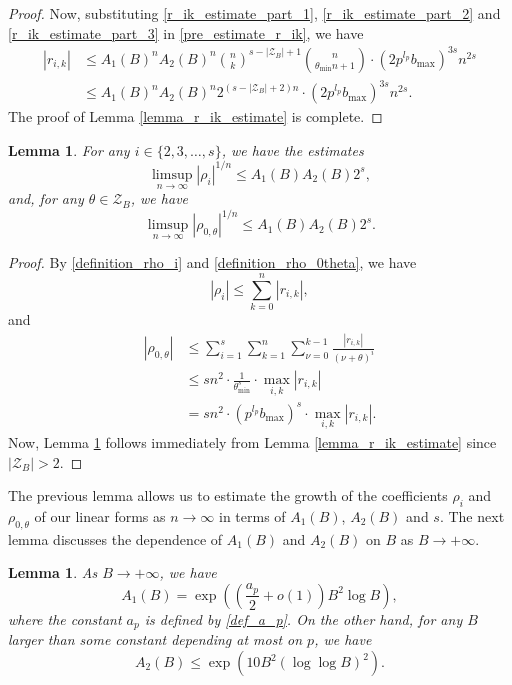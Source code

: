 \documentclass[12pt]{article}
\newtheorem{lemma}[theorem]{Lemma}
\numberwithin{equation}{section}
\begin{document}
\begin{proof}
Now, substituting \eqref{r_ik_estimate_part_1}, \eqref{r_ik_estimate_part_2} and \eqref{r_ik_estimate_part_3} in \eqref{pre_estimate_r_ik}, we have
\begin{align*}
	|r_{i,k}| &\leqslant A_1(B)^nA_2(B)^n  \binom{n}{k}^{s-|\mathcal{Z}_B|+1} \binom{n}{\theta_{\min}n+1} \cdot (2p^{l_p}b_{\max})^{3s}n^{2s} \\
	&\leqslant A_1(B)^nA_2(B)^n 2^{(s-|\mathcal{Z}_B|+2)n} \cdot (2p^{l_p}b_{\max})^{3s}n^{2s}.
\end{align*}
The proof of Lemma \ref{lemma_r_ik_estimate} is complete.
\end{proof}


\begin{lemma}\label{lemma_rho_i_estimate}
For any $i \in \{2,3,\ldots,s\}$, we have the estimates
\[ \limsup_{n \to \infty} |\rho_i|^{1/n}  \leqslant A_1(B)A_2(B)2^s, \]
and, for any $\theta \in \mathcal{Z}_B$, we have
\[ \limsup_{n \to \infty} |\rho_{0,\theta}|^{1/n}  \leqslant A_1(B)A_2(B)2^s. \]
\end{lemma}

\begin{proof}
By \eqref{definition_rho_i} and \eqref{definition_rho_0theta}, we have
\[ |\rho_{i}| \leqslant \sum_{k=0}^{n} |r_{i,k}|, \]
and
\begin{align*}
 |\rho_{0,\theta}| &\leqslant \sum_{i=1}^{s}\sum_{k=1}^{n}\sum_{\nu=0}^{k-1} \frac{|r_{i,k}|}{(\nu+\theta)^{i}} \\
 & \leqslant  sn^2 \cdot \frac{1}{\theta_{\min}^s} \cdot \max_{i,k}|r_{i,k}| \\
 & = sn^2 \cdot (p^{l_p}b_{\max})^s \cdot \max_{i,k}|r_{i,k}|.
\end{align*}
Now, Lemma \ref{lemma_rho_i_estimate} follows immediately from Lemma \ref{lemma_r_ik_estimate} since $|\mathcal{Z}_B| > 2$.
\end{proof}

The previous lemma allows us to estimate the growth of the coefficients $\rho_i$ and $\rho_{0,\theta}$ of our linear forms as $n\to \infty$ in terms of $A_1(B)$, $A_2(B)$ and $s$. The next lemma discusses the dependence of $A_1(B)$ and $A_2(B)$ on $B$ as $B\to + \infty$. 

\begin{lemma}\label{lemma_estimate_A_1_A_2}
	As $B \to +\infty$, we have
	\[ A_1(B) = \exp\left( \left(\frac{a_p}{2}+o(1)\right)B^2\log B \right), \]
 where the constant $a_p$ is defined by \eqref{def_a_p}.
	On the other hand, for any $B$ larger than some constant depending at most on $p$, we have
	\[ A_2(B) \leqslant \exp\left( 10B^2(\log\log B)^2 \right). \]
\end{lemma}
\end{document}
